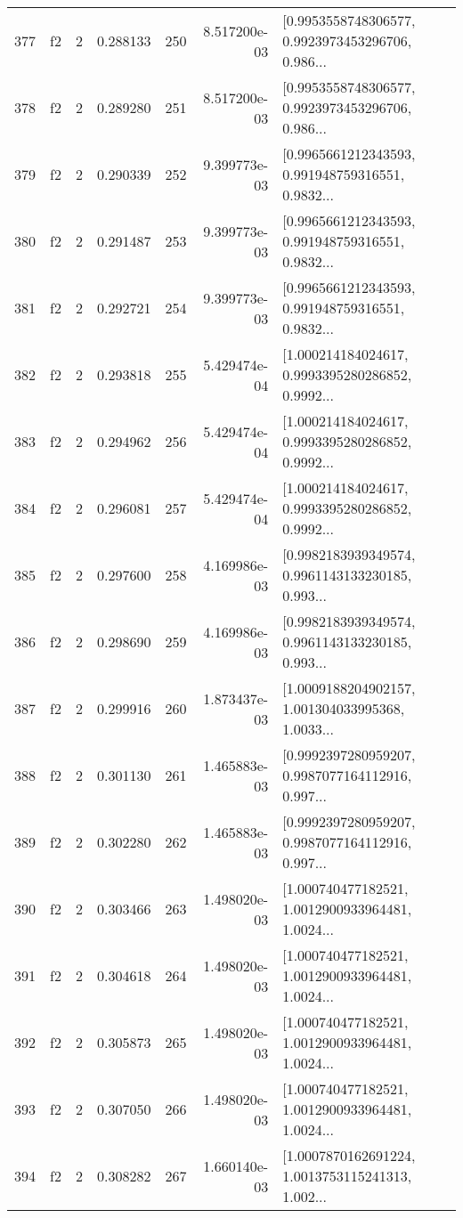 \begin{tabular}{lllrlrl}
377 &  f2 &   2 &  0.288133 &  250 &  8.517200e-03 &  [0.9953558748306577, 0.9923973453296706, 0.986... \\
378 &  f2 &   2 &  0.289280 &  251 &  8.517200e-03 &  [0.9953558748306577, 0.9923973453296706, 0.986... \\
379 &  f2 &   2 &  0.290339 &  252 &  9.399773e-03 &  [0.9965661212343593, 0.991948759316551, 0.9832... \\
380 &  f2 &   2 &  0.291487 &  253 &  9.399773e-03 &  [0.9965661212343593, 0.991948759316551, 0.9832... \\
381 &  f2 &   2 &  0.292721 &  254 &  9.399773e-03 &  [0.9965661212343593, 0.991948759316551, 0.9832... \\
382 &  f2 &   2 &  0.293818 &  255 &  5.429474e-04 &  [1.000214184024617, 0.9993395280286852, 0.9992... \\
383 &  f2 &   2 &  0.294962 &  256 &  5.429474e-04 &  [1.000214184024617, 0.9993395280286852, 0.9992... \\
384 &  f2 &   2 &  0.296081 &  257 &  5.429474e-04 &  [1.000214184024617, 0.9993395280286852, 0.9992... \\
385 &  f2 &   2 &  0.297600 &  258 &  4.169986e-03 &  [0.9982183939349574, 0.9961143133230185, 0.993... \\
386 &  f2 &   2 &  0.298690 &  259 &  4.169986e-03 &  [0.9982183939349574, 0.9961143133230185, 0.993... \\
387 &  f2 &   2 &  0.299916 &  260 &  1.873437e-03 &  [1.0009188204902157, 1.001304033995368, 1.0033... \\
388 &  f2 &   2 &  0.301130 &  261 &  1.465883e-03 &  [0.9992397280959207, 0.9987077164112916, 0.997... \\
389 &  f2 &   2 &  0.302280 &  262 &  1.465883e-03 &  [0.9992397280959207, 0.9987077164112916, 0.997... \\
390 &  f2 &   2 &  0.303466 &  263 &  1.498020e-03 &  [1.000740477182521, 1.0012900933964481, 1.0024... \\
391 &  f2 &   2 &  0.304618 &  264 &  1.498020e-03 &  [1.000740477182521, 1.0012900933964481, 1.0024... \\
392 &  f2 &   2 &  0.305873 &  265 &  1.498020e-03 &  [1.000740477182521, 1.0012900933964481, 1.0024... \\
393 &  f2 &   2 &  0.307050 &  266 &  1.498020e-03 &  [1.000740477182521, 1.0012900933964481, 1.0024... \\
394 &  f2 &   2 &  0.308282 &  267 &  1.660140e-03 &  [1.0007870162691224, 1.0013753115241313, 1.002... \\

\end{tabular}
